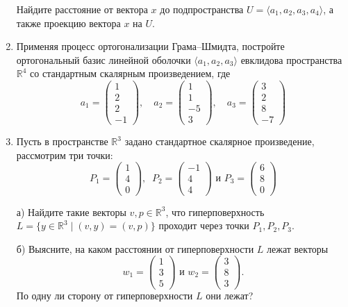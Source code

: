 \documentclass[a4paper,12pt]{article}
\begin{document}
\begin{enumerate}
Найдите расстояние от вектора $x$ до подпространства $U = \langle a_1,a_2,a_3, a_4 \rangle$, а также проекцию вектора $x$ на $U$.
\vspace{5pt}

\item Применяя процесс ортогонализации Грама--Шмидта, постройте ортогональный базис линейной оболочки  $\langle a_1,a_2,a_3\rangle$ евклидова пространства $\mathbb R^4$ со стандартным скалярным произведением, где
\[
a_1=
\begin{pmatrix}
{1}\\{2}\\{2}\\{-1}
\end{pmatrix}
,\quad
a_2=
\begin{pmatrix}
{1}\\{1}\\{-5}\\{3}
\end{pmatrix}
,\quad
a_3=
\begin{pmatrix}
{3}\\{2}\\{8}\\{-7}
\end{pmatrix}
\]
\vspace{5pt}

\item Пусть в пространстве $\mathbb R^3$ задано стандартное скалярное произведение, рассмотрим три точки:
\[
P_1 = 
\begin{pmatrix}
{1}\\{4}\\{0}
\end{pmatrix},\;\;
P_2 = 
\begin{pmatrix}
{-1}\\{4}\\{4}
\end{pmatrix}\text{ и }
P_3 = 
\begin{pmatrix}
{6}\\{8}\\{0}
\end{pmatrix}
\]

а) Найдите такие векторы $v, p\in \mathbb R^3$, что гиперповерхность $L = \{y\in \mathbb R^3 \mid (v, y) = (v, p)\}$ проходит через точки $P_1, P_2, P_3$.

б) Выясните, на каком расстоянии от гиперповерхности $L$ лежат векторы
\[
w_1 =
\begin{pmatrix}
{1}\\{3}\\{5}
\end{pmatrix}
\text{ и \ }
w_2 = 
\begin{pmatrix}
{3}\\{8}\\{3}
\end{pmatrix}.
\]
По одну ли сторону от гиперповерхности $L$ они лежат?


\end{enumerate}
\end{document}
